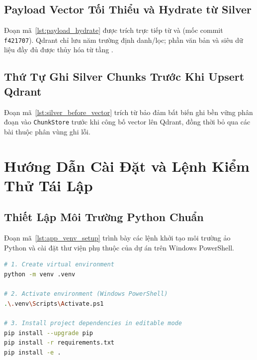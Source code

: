 \subsection{Payload Vector Tối Thiểu và Hydrate từ Silver}
\label{sec:appendix_lst_hydrate}

Đoạn mã~\ref{lst:payload_hydrate} được trích trực tiếp từ  và  (mốc commit \texttt{f421707}). Qdrant chỉ lưu năm trường định danh/lọc; phần văn bản và siêu dữ liệu đầy đủ được thủy hóa từ tầng .



\subsection{Thứ Tự Ghi Silver Chunks Trước Khi Upsert Qdrant}
\label{sec:appendix_lst_silver_first}

Đoạn mã~\ref{lst:silver_before_vector} trích từ  bảo đảm bất biến ghi bền vững phân đoạn vào \texttt{ChunkStore} trước khi công bố vector lên Qdrant, đồng thời bỏ qua các bài thuộc phân vùng ghi lỗi.



\section{Hướng Dẫn Cài Đặt và Lệnh Kiểm Thử Tái Lập}
\label{sec:appendix_quickstart}

\subsection{Thiết Lập Môi Trường Python Chuẩn}
\label{sec:appendix_venv}

Đoạn mã~\ref{lst:app_venv_setup} trình bày các lệnh khởi tạo môi trường ảo Python và cài đặt thư viện phụ thuộc của dự án trên Windows PowerShell.

\begin{lstlisting}[language=bash, caption={Khoi tao moi truong ao Python va cai dat goi phu thuoc}, label={lst:app_venv_setup}]
# 1. Create virtual environment
python -m venv .venv

# 2. Activate environment (Windows PowerShell)
.\.venv\Scripts\Activate.ps1

# 3. Install project dependencies in editable mode
pip install --upgrade pip
pip install -r requirements.txt
pip install -e .
\end{lstlisting}

